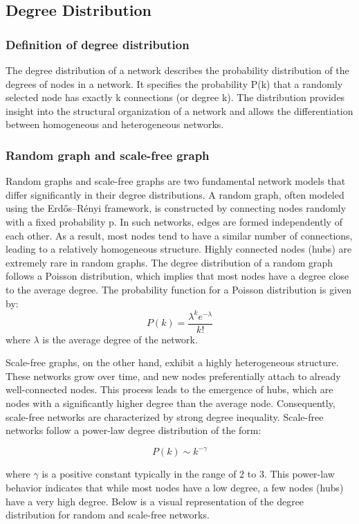 \subsection{Degree Distribution}
\subsubsection{Definition of degree distribution}
The degree distribution of a network describes the probability distribution
of the degrees of nodes in a network. It specifies the probability P(k) that a randomly selected node has 
exactly k connections (or degree k). The distribution provides insight into the structural organization 
of a network and allows the differentiation between homogeneous and heterogeneous networks.

\subsubsection{Random graph and scale-free graph}
Random graphs and scale-free graphs are two fundamental network models that differ significantly in their
degree distributions.
A random  graph, often modeled using the Erdős–Rényi framework, is constructed by connecting nodes 
randomly with a fixed probability p. In such networks, edges are formed independently of each other. 
As a result, most nodes tend to have a similar number of connections, 
leading to a relatively homogeneous structure. Highly connected nodes (hubs) are extremely rare in random graphs.
The degree distribution of a random graph follows a Poisson distribution, which implies that most nodes have a degree
close to the average degree. The probability function for a Poisson distribution is given by:
\[P(k) = \frac{\lambda^k e^{-\lambda}}{k!}\]
where $\lambda$ is the average degree of the network.

Scale-free graphs, on the other hand, exhibit a highly heterogeneous structure.
These networks grow over time, and new nodes preferentially attach to already well-connected nodes.
This process leads to the emergence of hubs, which are nodes with a significantly higher degree than the average node.
Consequently, scale-free networks are characterized by strong degree inequality.
Scale-free networks follow a power-law degree distribution of the form:

\[P(k) \sim k^{-\gamma}\]

where $\gamma$ is a positive constant typically in the range of 2 to 3. 
This power-law behavior indicates that while most nodes have a low degree, 
a few nodes (hubs) have a very high degree.
Below is a visual representation of the degree distribution for random and scale-free networks.

